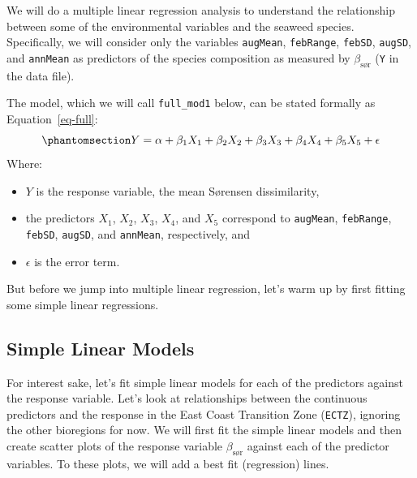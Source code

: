 \documentclass[
  letterpaper,
]{book}
\providecommand{\tightlist}{%
  \setlength{\itemsep}{0pt}\setlength{\parskip}{0pt}}\usepackage{longtable,booktabs,array}
\begin{document}
We will do a multiple linear regression analysis to understand the
relationship between some of the environmental variables and the seaweed
species. Specifically, we will consider only the variables
\texttt{augMean}, \texttt{febRange}, \texttt{febSD}, \texttt{augSD}, and
\texttt{annMean} as predictors of the species composition as measured by
\(\beta_\text{sør}\) (\texttt{Y} in the data file).

The model, which we will call \texttt{full\_mod1} below, can be stated
formally as Equation~\ref{eq-full}:
\begin{equation}\phantomsection\label{eq-full}{Y = \alpha + \beta_1 X_1 + \beta_2 X_2 + \beta_3 X_3 + \beta_4 X_4 + \beta_5 X_5 + \epsilon}\end{equation}
Where:

\begin{itemize}
\tightlist
\item
  \(Y\) is the response variable, the mean Sørensen dissimilarity,
\item
  the predictors \(X_1\), \(X_2\), \(X_3\), \(X_4\), and \(X_5\)
  correspond to \texttt{augMean}, \texttt{febRange}, \texttt{febSD},
  \texttt{augSD}, and \texttt{annMean}, respectively, and
\item
  \(\epsilon\) is the error term.
\end{itemize}

But before we jump into multiple linear regression, let's warm up by
first fitting some simple linear regressions.

\subsection{Simple Linear Models}\label{simple-linear-models}

For interest sake, let's fit simple linear models for each of the
predictors against the response variable. Let's look at relationships
between the continuous predictors and the response in the East Coast
Transition Zone (\texttt{ECTZ}), ignoring the other bioregions for now.
We will first fit the simple linear models and then create scatter plots
of the response variable \(\beta_\text{sør}\) against each of the
predictor variables. To these plots, we will add a best fit (regression)
lines.
\end{document}
